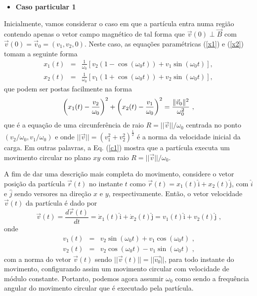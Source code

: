 \documentclass[twocolumn]{rbef}
\newcommand{\1}{\mathbbm{1}}
\begin{document}
\begin{itemize}
\item \textbf{Caso particular 1}
\end{itemize}

Inicialmente, vamos considerar o caso em que a partícula entra numa
região contendo apenas o vetor campo magnético de tal forma que
$\vec{v}(0)\perp\vec{B}$ com
$\vec{v}(0) = \vec{v}_{0} =(v_{1},v_{2},0)$. Neste caso, as equações
paramétricas (\ref{x1}) e (\ref{x2}) tomam a seguinte forma
\begin{eqnarray}
  x_{1}\left( t\right)  &=&\frac{1}{\omega_{0}}\left[v_{2} (1 - \cos \left(\omega_{0} t\right)) + v_{1}\sin \left( \omega_{0} t\right) \right] \label{circularx} , \\
  x_{2}\left( t\right)  &=&\frac{1}{\omega_{0}}\left[ v_{1}(1 + \cos \left(
                            \omega_{0} t\right)) + v_{2}\sin \left( \omega_{0} t\right) \right] , \label{circulary}
\end{eqnarray}%
que podem ser postas facilmente na forma
\begin{equation}
  \left( x_{1}(t) - \dfrac{v_{2}}{\omega_{0}}\right) ^{2} + \left( x_{2}(t) - \dfrac{v_{1}}{\omega_{0}}\right) ^{2} = \dfrac{\Arrowvert \vec{v}_{0}\Arrowvert^{2}}{\omega_{0}^{2}} \text{ ,} \label{c1}
\end{equation}
que é a equação de uma circunferência de raio
$R=\vert \vert \vec{v}\vert \vert / \omega_{0}$ centrada no ponto
$\left( v_{2} / \omega_{0},v_{1} / \omega_{0}\right) $ e onde
$\vert \vert \vec{v} \vert \vert = (v_{1}^2 + v_{2}^2)^{\frac{1}{2}}$ é
a norma da velocidade inicial da carga. Em outras palavras, a
Eq. (\ref{c1}) mostra que a partícula executa um movimento circular no
plano $xy$ com raio $R=\vert \vert \vec{v}\vert \vert /\omega_{0}$.

A fim de dar uma descrição mais completa do movimento, considere o vetor
posição da partícula $\vec{r}(t)$ no instante $t$ como
$\vec{r}(t)=x_{1}(t) \hat{\text{i}} + x_{2}(t) \hat{\text{j}} $, com
$\hat{i}$ e $\hat{j}$ sendo versores na direção $x$ e $y$,
respectivamente. Então, o vetor velocidade $\vec{v}(t)$ da partícula é
dado por
\begin{equation}
  \vec{v}(t) = \frac{d \vec{r}(t)}{dt} = \dot{x}_{1}(t) \hat{\text{i}} + \dot{x}_{2}(t) \hat{\text{j}} = v_{1}(t) \hat{\text{i}} + v_{2}(t) \hat{\text{j}} \text{ ,}
\end{equation}
onde
\begin{eqnarray}
  v_{1}(t) &=& v_{2} \sin (\omega _{0} t) + v_{1} \cos (\omega _{0} t) \text{ ,} \\
  v_{2}(t) &=& v_{2} \cos (\omega _{0} t) - v_{1} \sin (\omega _{0} t) \text{ ,}
\end{eqnarray}
com a norma do vetor $\vec{v}(t)$ sendo
$\vert \vert \vec{v}(t) \vert \vert = \vert \vert \vec{v_{0}}\vert
\vert$, para todo instante do movimento, configurando assim um movimento
circular com velocidade de módulo constante. Portanto, podemos agora
assumir $\omega_{0}$ como sendo a frequência angular do movimento
circular que é executado pela partícula.
\end{document}
